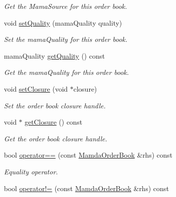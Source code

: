 \begin{CompactItemize}
\begin{CompactList}\small\item\em Get the Mama\-Source for this order book. \item\end{CompactList}\item 
void \hyperlink{classWombat_1_1MamdaOrderBook_a3e9d873afa57abdbecba397fe3ace79}{set\-Quality} (mama\-Quality quality)
\begin{CompactList}\small\item\em Set the mama\-Quality for this order book. \item\end{CompactList}\item 
mama\-Quality \hyperlink{classWombat_1_1MamdaOrderBook_b4646b4abb66e91bcceaf93b61acb034}{get\-Quality} () const 
\begin{CompactList}\small\item\em Get the mama\-Quality for this order book. \item\end{CompactList}\item 
void \hyperlink{classWombat_1_1MamdaOrderBook_000519ebdbe9b646f1ef93227fd8927a}{set\-Closure} (void $\ast$closure)
\begin{CompactList}\small\item\em Set the order book closure handle. \item\end{CompactList}\item 
void $\ast$ \hyperlink{classWombat_1_1MamdaOrderBook_a5600a658974539eaee3a0ea08da96c3}{get\-Closure} () const 
\begin{CompactList}\small\item\em Get the order book closure handle. \item\end{CompactList}\item 
bool \hyperlink{classWombat_1_1MamdaOrderBook_6b2b646dd6a77af9983fbe92ca12ec04}{operator==} (const \hyperlink{classWombat_1_1MamdaOrderBook}{Mamda\-Order\-Book} \&rhs) const 
\begin{CompactList}\small\item\em Equality operator. \item\end{CompactList}\item 
bool \hyperlink{classWombat_1_1MamdaOrderBook_721c59c8d5e70bef3e1f981b592e486f}{operator!=} (const \hyperlink{classWombat_1_1MamdaOrderBook}{Mamda\-Order\-Book} \&rhs) const 

\end{CompactItemize}

